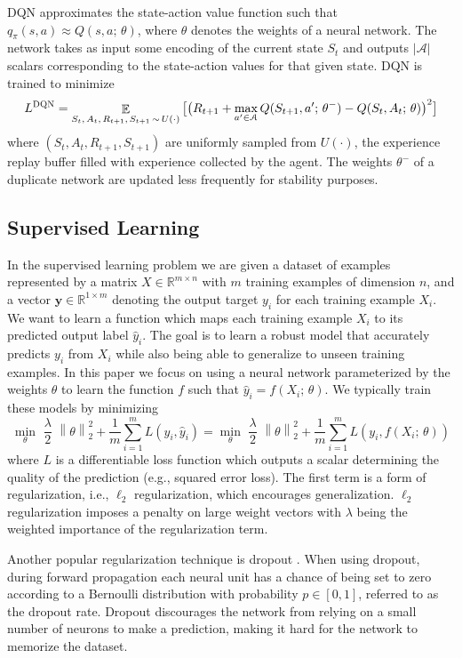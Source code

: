 \documentclass{article}
\begin{document}
DQN approximates the state-action value function such that $q_{\pi}(s, a) \approx Q(s, a; \, \theta)$, where $\theta$ denotes the weights of a neural network. The network takes as input some encoding of the current state $S_t$ and outputs $|\mathcal{A}|$ scalars corresponding to the state-action values for that given state.
DQN is trained to minimize
$$
L^{\tiny\textsc{DQN}} = \mathop{\mathbb{E}}_{S_{t},\, A_t,\, R_{t+1},\, S_{t+1} \, \sim \, U(\cdot)} \big[ {\big( R_{t+1} + \max_{a' \in \mathcal{A}} Q(S_{t+1}, a';\, \theta^{-})  - Q(S_t, A_t;\, \theta) \big)}^2 \big]
$$
where $( S_t, A_t, R_{t+1}, S_{t+1} )$ are uniformly sampled from $U(\cdot)$, the experience replay buffer filled with experience collected by the agent. The weights $\theta^{-}$ of a duplicate network are updated less frequently for stability purposes.


\subsection{Supervised Learning}
In the supervised learning problem we are given a dataset of examples represented by a matrix $X \in \mathbb{R}^{m \times n}$ with $m$ training examples of dimension $n$, and a vector $\mathbf{y} \in \mathbb{R}^{1 \times m}$ denoting the output target $y_i$ for each training example $X_i$. 
We want to learn a function which maps each training example $X_i$ to its predicted output label $\hat{y}_i$. The goal is to learn a robust model that accurately predicts $y_i$ from $X_i$ while also being able to generalize to unseen training examples. In this paper we focus on using a neural network parameterized by the weights $\theta$ to learn the function $f$ such that $\hat{y}_i = f(X_i;\, \theta)$. We typically train these models by minimizing
$$
\min_{\theta} \,\, \frac{\lambda}{2} \,\, {\left\| \theta \right\|}^{2}_{2} + \frac{1}{m} \sum_{i = 1}^{m}{L(y_i, \hat{y}_i)} = \min_{\theta} \,\, \frac{\lambda}{2} \,\, {\left\| \theta \right\|}^{2}_{2} + \frac{1}{m} \sum_{i = 1}^{m}{L(y_i, f(X_i;\, \theta))}
$$
where $L$ is a differentiable loss function which outputs a scalar determining the quality of the prediction (e.g., squared error loss).
The first term is a form of regularization, i.e., $\ell_2$ regularization, which encourages generalization. $\ell_2$ regularization imposes a penalty on large weight vectors with $\lambda$ being the weighted importance of the regularization term.

Another popular regularization technique is dropout \citep{Srivastava14}. When using dropout, during forward propagation each neural unit has a chance of being set to zero according to a Bernoulli distribution with probability $p \in [0, 1]$, referred to as the dropout rate. Dropout discourages the network from relying on a small number of neurons to make a prediction, making it hard for the network to memorize the dataset.
\end{document}
